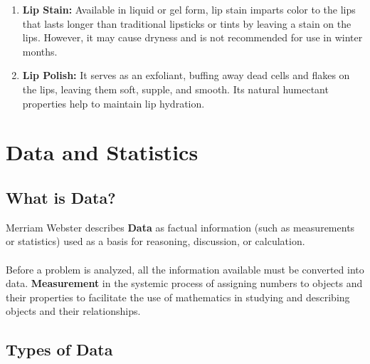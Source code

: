 \documentclass{article}
\begin{document}
\begin{enumerate}
    \item \textbf{Lip Stain:} Available in liquid or gel form, lip stain imparts color to the lips that lasts longer than traditional lipsticks or tints by leaving a stain on the lips. However, it may cause dryness and is not recommended for use in winter months.

    \item \textbf{Lip Polish:} It serves as an exfoliant, buffing away dead cells and flakes on the lips, leaving them soft, supple, and smooth. Its natural humectant properties help to maintain lip hydration.

\end{enumerate}

\newpage

\section{Data and Statistics}

\subsection{What is Data?}
Merriam Webster describes \textbf{Data} as factual information (such as measurements or statistics) used as a basis for reasoning,  discussion, or calculation.
\\ \\
Before a problem is analyzed, all the information available must be converted into data. \textbf{Measurement} in the systemic process of assigning numbers to objects and their properties to facilitate the use of mathematics in studying and describing  objects and their relationships.

\subsection{Types of Data}
\end{document}
